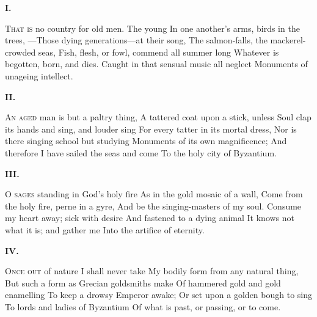 \documentclass[fontsize=9, a5paper]{scrbook}
\begin{document}
\pagebreak

\begin{poem}
	\begin{stanza}
		\textbf{I.}
		
		\textsc{That is} no country for old men. The young\verseline
		In one another's arms, birds in the trees,\verseline
		—Those dying generations—at their song,\verseline
		The salmon-falls, the mackerel-crowded seas,\verseline
		Fish, flesh, or fowl, commend all summer long\verseline
		Whatever is begotten, born, and dies.\verseline
		Caught in that sensual music all neglect\verseline
		Monuments of unageing intellect.
	\end{stanza}
	
	\begin{stanza}
		\textbf{II.}
		
		\textsc{An aged} man is but a paltry thing,\verseline
		A tattered coat upon a stick, unless\verseline
		Soul clap its hands and sing, and louder sing\verseline
		For every tatter in its mortal dress,\verseline
		Nor is there singing school but studying\verseline
		Monuments of its own magnificence;\verseline
		And therefore I have sailed the seas and come\verseline
		To the holy city of Byzantium.
	\end{stanza}
	
	\pagebreak

	\begin{stanza}
		\textbf{III.}
		
		\textsc{O sages} standing in God's holy fire\verseline
		As in the gold mosaic of a wall,\verseline
		Come from the holy fire, perne in a gyre,\verseline
		And be the singing-masters of my soul.\verseline
		Consume my heart away; sick with desire\verseline
		And fastened to a dying animal\verseline
		It knows not what it is; and gather me\verseline
		Into the artifice of eternity.
	\end{stanza}
	
	\begin{stanza}
		\textbf{IV.}
		
		\textsc{Once out} of nature I shall never take\verseline
		My bodily form from any natural thing,\verseline
		But such a form as Grecian goldsmiths make\verseline
		Of hammered gold and gold enamelling\verseline
		To keep a drowsy Emperor awake;\verseline
		Or set upon a golden bough to sing\verseline
		To lords and ladies of Byzantium\verseline
		Of what is past, or passing, or to come.
	\end{stanza}
\end{poem}
\end{document}
